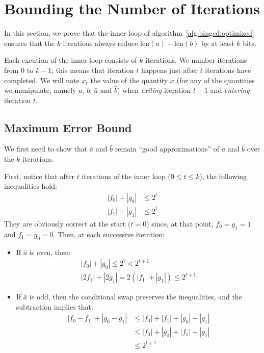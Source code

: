 \documentclass{llncs}
\newcommand{\bitlength}{\text{len}}
\begin{document}
\appendix

\newpage
\section{Bounding the Number of Iterations}\label{sec:iterbound}

In this section, we prove that the inner loop of
algorithm~\ref{alg:bingcd:optimized} ensures that the $k$ iterations
always reduce $\bitlength(a)+\bitlength(b)$ by at least $k$ bits.

Each excution of the inner loop consists of $k$ iterations. We number
iterations from $0$ to $k-1$; this means that iteration $t$ happens just
after $t$ iterations have completed. We will note $x_t$ the value of the
quantity $x$ (for any of the quantities we manipulate, namely $a$, $b$,
$\bar a$ and $\bar b$) when \emph{exiting} iteration $t-1$ and
\emph{entering} iteration $t$.

\subsection{Maximum Error Bound}\label{sec:iterbound:error}

We first need to show that $\bar a$ and $\bar b$ remain ``good
approximations'' of $a$ and $b$ over the $k$ iterations.

First, notice that after $t$ iterations of the inner loop
($0\leq t\leq k$), the following inequalities hold:
\begin{align*}
    |f_0| + |g_0| &\leq 2^t \\
    |f_1| + |g_1| &\leq 2^t
\end{align*}
They are obviously correct at the start ($t = 0$) since, at that point,
$f_0 = g_1 = 1$ and $f_1 = g_0 = 0$. Then, at each successive iteration:
\begin{itemize}

    \item If $\bar a$ is even, then:
    \begin{equation*}
        \begin{gathered}
            |f_0| + |g_0| \leq 2^t < 2^{t+1} \\
            |2f_1| + |2g_1| = 2(|f_1| + |g_1|) \leq 2^{t+1}
        \end{gathered}
    \end{equation*}

    \item If $\bar a$ is odd, then the conditional swap preserves the
    inequalities, and the subtraction implies that:
    \begin{align*}
        |f_0 - f_1| + |g_0 - g_1| &\leq |f_0| + |f_1| + |g_0| + |g_1| \\
                                  &\leq |f_0| + |g_0| + |f_1| + |g_1| \\
                                  &\leq 2^{t+1}
    \end{align*}

\end{itemize}
\end{document}
